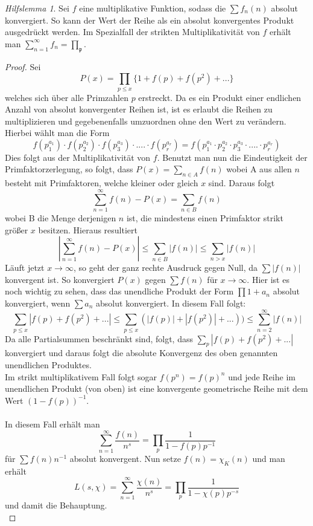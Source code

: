 \documentclass[10pt,a4paper]{article}
\theoremstyle{plain}
\theoremstyle{definition}
\theoremstyle{remark}
\newtheorem{hilfslem}{Hilfslemma}
\begin{document}
 \begin{hilfslem}\label{hilfslemma3}
Sei $f$ eine multiplikative Funktion, sodass die $\sum f_n(n)$ absolut konvergiert. So kann der Wert der Reihe als ein absolut konvergentes Produkt ausgedrückt werden. Im Spezialfall der strikten Multiplikativität von $f$ erhält man $\sum_{n=1}^{\infty}f_n=\prod_{\mathfrak{p}}$.

\begin{proof}

Sei $$P(x)= \prod_{p\leq x}\{1+f(p)+f(p^2)+...\}$$welches sich über alle Primzahlen $p$ erstreckt. Da es ein Produkt einer endlichen Anzahl von absolut konvergenter Reihen ist, ist es erlaubt die Reihen zu multiplizieren und gegebenenfalls umzuordnen ohne den Wert zu verändern. Hierbei wählt man die Form
$$f(p_1^{a_1})\cdot f(p_2^{a_2})\cdot f(p_3^{a_3})\cdot....\cdot f(p_{r}^{a_r})=f(p_{1}^{a_1}\cdot p_{2}^{a_2}\cdot p_{3}^{a_3}\cdot ....\cdot p_{r}^{a_r})$$Dies folgt aus der Multiplikativität von $f$. Benutzt man nun die Eindeutigkeit der Primfaktorzerlegung, so folgt, dass $P(x)=\sum_{n \in A}f(n)$ wobei A aus allen $n$ besteht mit Primfaktoren, welche kleiner oder gleich $x$  sind. Daraus folgt $$\sum_{n=1}^{\infty}f(n)-P(x)= \sum_{n \in B}f(n)$$wobei B die Menge derjenigen $n$ ist, die mindestens einen Primfaktor strikt größer $x$ besitzen. Hieraus resultiert$$|\sum_{n=1}^{\infty}f(n)-P(x)|\leq\sum_{n \in B}|f(n)|\leq\sum_{n > x}|f(n)|$$ Läuft jetzt $x\to\infty$, so geht der ganz rechte Ausdruck gegen Null, da $\sum|f(n)|$ konvergent ist. So konvergiert $P(x)$ gegen $\sum f(n)$ für $x \to \infty$. Hier ist es noch wichtig zu sehen, dass das unendliche Produkt der Form $\prod1+a_n$ absolut konvergiert, wenn $\sum a_n$ absolut konvergiert. In diesem Fall folgt:$$\sum_{p\leq x}|f(p)+f(p^2)+...| \leq \sum_{p \leq x}(|f(p)|+|f(p^2)|+...))\leq \sum_{n=2}^{\infty}|f(n)|$$Da alle Partialsummen beschränkt sind, folgt, dass $\sum_{p}|f(p)+f(p^2)+...|$ konvergiert und daraus folgt die absolute Konvergenz des oben genannten unendlichen Produktes.
\\
Im strikt multiplikativem Fall folgt sogar $f(p^n)=f(p)^n$ und jede Reihe im unendlichen Produkt (von oben) ist eine konvergente geometrische Reihe mit dem Wert $(1-f(p))^{-1}$.
\\
\\
In diesem Fall  erhält man $$\sum_{n=1}^{\infty}\frac{f(n)}{n^s}=\prod_{p}\frac{1}{1-f(p)p^{-1}}$$ für $\sum f(n)n^{-1}$ absolut konvergent. Nun setze  $f(n)=\chi_K(n)$ und man erhält $$L(s,\chi)=\sum_{n=1}^{\infty}\frac{\chi(n)}{n^s}=\prod_{p}\frac{1}{1-\chi(p)p^{-s}}$$und damit die Behauptung.\\

\end{proof}
\end{hilfslem}
\end{document}
